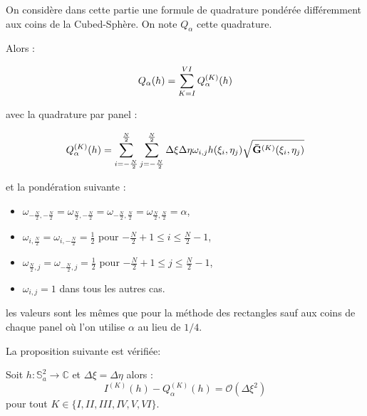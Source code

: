 On considère dans cette partie une formule de quadrature pondérée différemment aux coins de la Cubed-Sphère. On note $Q_{\alpha}$ cette quadrature.

Alors :

\begin{equation}
Q_{\alpha}(h)= \displaystyle\sum\limits_{K=I}^{VI} Q^{(K)}_{\alpha}(h)
\end{equation}

avec la quadrature par panel :

\begin{equation}
Q_{\alpha}^{(K)}(h)=\displaystyle\sum\limits_{i = -\frac{N}{2}}^{\frac{N}{2}}\displaystyle\sum\limits_{j = -\frac{N}{2}}^{\frac{N}{2}} \Delta \xi \Delta \eta \omega_{i,j} h(\xi_i, \eta_j) \sqrt{\mathbf{\bar{G}}^{(K)}(\xi_i, \eta_j)}
\label{eq:alpha par panel}
\end{equation}

et la pondération suivante :

\begin{itemize}
\item $\omega_{-\frac{N}{2},-\frac{N}{2}}=\omega_{\frac{N}{2},-\frac{N}{2}}=\omega_{-\frac{N}{2},\frac{N}{2}}=\omega_{\frac{N}{2},\frac{N}{2}}=\alpha$,
\item $\omega_{i,\frac{N}{2}}=\omega_{i,-\frac{N}{2}}=\frac{1}{2}$ pour $-\frac{N}{2}+1 \leq i \leq \frac{N}{2}-1$,
\item $\omega_{\frac{N}{2},j}=\omega_{-\frac{N}{2},j}=\frac{1}{2}$ pour $-\frac{N}{2}+1 \leq j \leq \frac{N}{2}-1$,
\item $\omega_{i,j}=1$ dans tous les autres cas.
\end{itemize}

les valeurs sont les mêmes que pour la méthode des rectangles sauf aux coins de chaque panel où l'on utilise $\alpha$ au lieu de $1/4$.

La proposition suivante est vérifiée:

\begin{proposition}
Soit $h: \mathbb{S}_a^2 \rightarrow \mathbb{C}$ et $\Delta \xi = \Delta \eta$ alors :
\begin{equation}
I^{(K)}(h) - Q^{(K)}_{\alpha}(h) = \mathcal{O} \left( \Delta \xi^2 \right)
\end{equation}
pour tout $K \in \lbrace I, II, III, IV, V, VI \rbrace$.
\label{prop:consistance alpha panel}
\end{proposition}

